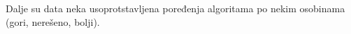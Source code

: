 \documentclass[fontsize=12bp, paper=a4]{scrarticle}
\begin{document}
Dalje su data neka usoprotstavljena poređenja algoritama po nekim osobinama (gori, nerešeno, bolji).









\newpage
\end{document}
